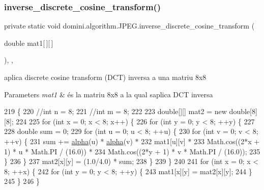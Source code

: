 \subsubsection{\texorpdfstring{inverse\+\_\+discrete\+\_\+cosine\+\_\+transform()}{inverse\_discrete\_cosine\_transform()}}
{\footnotesize\ttfamily private static void domini.\+algorithm.\+J\+P\+E\+G.\+inverse\+\_\+discrete\+\_\+cosine\+\_\+transform (\begin{DoxyParamCaption}\item[{double}]{mat1\mbox{[}$\,$\mbox{]}\mbox{[}$\,$\mbox{]} }\end{DoxyParamCaption})\hspace{0.3cm}{\ttfamily [inline]}, {\ttfamily [static]}, {\ttfamily [private]}}



aplica discrete cosine transform (D\+CT) inversa a una matriu 8x8 


\begin{DoxyParams}{Parameters}
{\em mat1} & és la matriu 8x8 a la qual s\textquotesingle{}aplica D\+CT inversa \\
\hline
\end{DoxyParams}

\begin{DoxyCode}
219                                                                            \{
220         \textcolor{comment}{//int n = 8;}
221         \textcolor{comment}{//int m = 8;}
222         
223         \textcolor{keywordtype}{double}[][] mat2 = \textcolor{keyword}{new} \textcolor{keywordtype}{double}[8][8];
224 
225         \textcolor{keywordflow}{for} (\textcolor{keywordtype}{int} x = 0; x < 8; x++) \{
226             \textcolor{keywordflow}{for} (\textcolor{keywordtype}{int} y = 0; y < 8; ++y) \{
227 
228                 \textcolor{keywordtype}{double} sum = 0;
229                 \textcolor{keywordflow}{for} (\textcolor{keywordtype}{int} u = 0; u < 8; ++u) \{ 
230                     \textcolor{keywordflow}{for} (\textcolor{keywordtype}{int} v = 0; v < 8; ++v)  \{ 
231                         sum += \hyperlink{classdomini_1_1algorithm_1_1JPEG_a058b0ee7eb44bbaec4078b5fc32c5107}{alpha}(u) * \hyperlink{classdomini_1_1algorithm_1_1JPEG_a058b0ee7eb44bbaec4078b5fc32c5107}{alpha}(v) * 
232                                mat1[u][v] *  
233                                Math.cos((2*x + 1) * u * Math.PI / (16.0)) *  
234                                Math.cos((2*y + 1) * v * Math.PI / (16.0)); 
235                     \} 
236                 \}
237                 mat2[x][y] = (1.0/4.0) * sum;
238             \}
239         \}
240 
241         \textcolor{keywordflow}{for} (\textcolor{keywordtype}{int} x = 0; x < 8; ++x) \{
242             \textcolor{keywordflow}{for} (\textcolor{keywordtype}{int} y = 0; y < 8; ++y) \{ 
243                 mat1[x][y] = mat2[x][y];
244             \}
245         \}
246     \}
\end{DoxyCode}
\mbox{\label{classdomini_1_1algorithm_1_1JPEG_a860d6166ef8edc40b0ffb61942589e5d}} 
